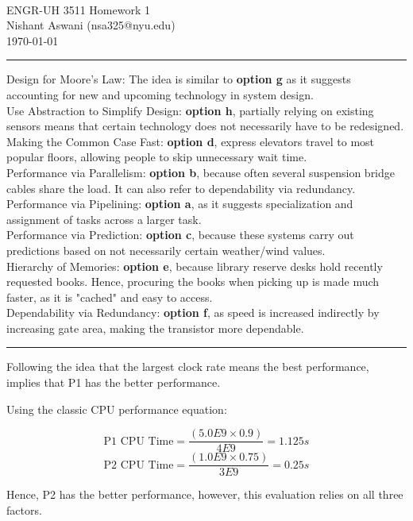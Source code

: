 \documentclass[11pt]{exam}
\makeatletter
\newcommand{\myname}{Nishant Aswani}
\newcommand{\myemail}{nsa325@nyu.edu}
\newcommand{\myhwtype}{Homework}
\newcommand{\myhwnum}{1}
\newcommand{\mycoursenumber}{ENGR-UH 3511}
\newcounter{questionCounter}
\newcounter{partCounter}[questionCounter]
\newenvironment{namedquestion}[1]{%
    \addtocounter{questionCounter}{1}%
    \setcounter{partCounter}{0}%
    \vspace{.2in}%
        \noindent{\bf #1}%
    \vspace{0.3em} \hrule \vspace{.1in}%
}{}
\makeatother
\begin{document}
\

{\newpage}


\thispagestyle{plain}
\begin{center}
  {\Large \mycoursenumber{} \myhwtype{} \myhwnum} \\
  \myname{} (\myemail{}) \\
  \today
\end{center}

\setcounter{questionCounter}{0}

\begin{namedquestion}{Question 1.2}
Design for Moore's Law: The idea is similar to \textbf{option g} as it suggests accounting for new and upcoming technology in system design. \\

Use Abstraction to Simplify Design: \textbf{option h}, partially relying on existing sensors means that certain technology does not necessarily have to be redesigned. \\

Making the Common Case Fast: \textbf{option d}, express elevators travel to most popular floors, allowing people to skip unnecessary wait time. \\

Performance via Parallelism: \textbf{option b}, because often several suspension bridge cables share the load. It can also refer to dependability via redundancy. \\

Performance via Pipelining: \textbf{option a}, as it suggests specialization and assignment of tasks across a larger task. \\

Performance via Prediction: \textbf{option c}, because these systems carry out predictions based on not necessarily certain weather/wind values. \\

Hierarchy of Memories: \textbf{option e}, because library reserve desks hold recently requested books. Hence, procuring the books when picking up is made much faster, as it is "cached" and easy to access.\\

Dependability via Redundancy: \textbf{option f}, as speed is increased indirectly by increasing gate area, making the transistor more dependable. 

\end{namedquestion}

\begin{namedquestion}{Question 1.12.1}
Following the idea that the largest clock rate means the best performance, implies that P1 has the better performance. 

Using the classic CPU performance equation:

 \[\text{P1 CPU Time} = \frac{(5.0E9 \times 0.9)}{4E9} = 1.125s\]
 \[\text{P2 CPU Time} = \frac{(1.0E9 \times 0.75)}{3E9} = 0.25s\]
 
Hence, P2 has the better performance, however, this evaluation relies on all three factors.
\end{namedquestion}
\end{document}
